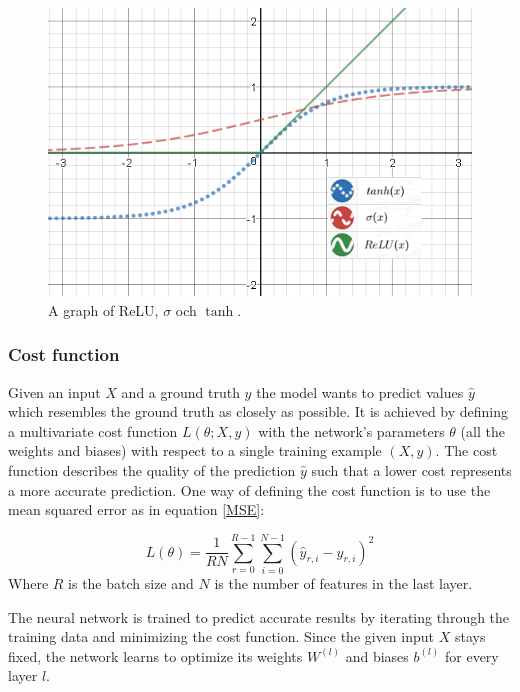 \documentclass[a4paper,11pt,twoside]{article}
\begin{document}
\begin{figure}[h]
	\centering
  		\includegraphics[scale=0.83]{activationfunction.png}
  	\caption{A graph of ReLU, $\sigma$ och $\tanh$.} \label{activation_function}
\end{figure}

\subsubsection{Cost function}
Given an input $X$ and a ground truth $y$ the model wants to predict values $\hat{y}$ which resembles the ground truth as closely as possible. It is achieved by defining a multivariate cost function $L(\theta; X, y)$  with the network's parameters $\theta$ (all the weights and biases) with respect to a single training example $(X, y)$. The cost function describes the quality of the prediction $\hat{y}$ such that a lower cost represents a more accurate prediction. One way of defining the cost function is to use the mean squared error as in equation \eqref{MSE}:

\begin{equation}\label{MSE}
L(\theta) = \frac{1}{RN} \sum^{R-1}_{r=0} \sum^{N-1}_{i=0} (\hat{y}_{r,i}-y_{r,i})^2
\end{equation}
Where $R$ is the batch size and $N$ is the number of features in the last layer.

The neural network is trained to predict accurate results by iterating through the training data and minimizing the cost function. Since the given input $X$ stays fixed, the network learns to optimize its weights $W^{(l)}$ and biases $b^{(l)}$ for every layer $l$.
\end{document}
